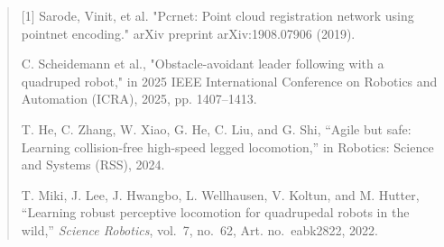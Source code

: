 \begin{quote}\color{reviewgray}
[1] Sarode, Vinit, et al. "Pcrnet: Point cloud registration network using pointnet encoding." arXiv preprint arXiv:1908.07906 (2019).\par
[2] C. Scheidemann et al., "Obstacle-avoidant leader following with a quadruped robot," in 2025 IEEE International Conference on Robotics and Automation (ICRA), 2025, pp. 1407–1413.\par
[3] T. He, C. Zhang, W. Xiao, G. He, C. Liu, and G. Shi, “Agile but safe: Learning collision-free high-speed legged locomotion,” in Robotics: Science and Systems (RSS), 2024.\par
[4] T. Miki, J. Lee, J. Hwangbo, L. Wellhausen, V. Koltun, and M. Hutter, ``Learning robust perceptive locomotion for quadrupedal robots in the wild,'' \emph{Science Robotics}, vol.~7, no.~62, Art. no.~eabk2822, 2022.\par
\end{quote}
